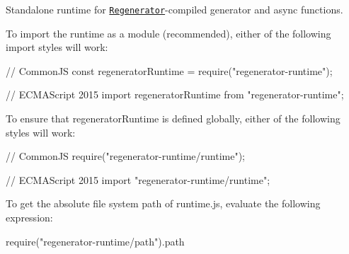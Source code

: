 Standalone runtime for \href{https://github.com/facebook/regenerator}{\tt Regenerator}-\/compiled generator and {\ttfamily async} functions.

To import the runtime as a module (recommended), either of the following import styles will work\+: 
\begin{DoxyCode}
// CommonJS
const regeneratorRuntime = require("regenerator-runtime");

// ECMAScript 2015
import regeneratorRuntime from "regenerator-runtime";
\end{DoxyCode}


To ensure that {\ttfamily regenerator\+Runtime} is defined globally, either of the following styles will work\+: 
\begin{DoxyCode}
// CommonJS
require("regenerator-runtime/runtime");

// ECMAScript 2015
import "regenerator-runtime/runtime";
\end{DoxyCode}


To get the absolute file system path of {\ttfamily runtime.\+js}, evaluate the following expression\+: 
\begin{DoxyCode}
require("regenerator-runtime/path").path
\end{DoxyCode}
 